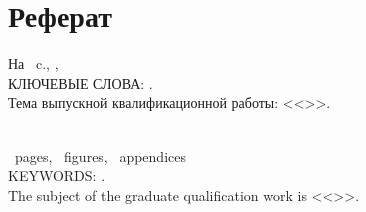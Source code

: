 \chapter*[Count-me]{Реферат} %
\thispagestyle{empty}%
%
%



На ~c.,
,
\\


{\MakeUppercase{Ключевые слова: \keywordsRu}.}\\ %

Тема выпускной квалификационной работы: <<\thesisTitle>>.


\abstractRu %
\newpage



\printTheAbstract\\ %


~pages, 
~figures, 
~appendices\\%

{\MakeUppercase{Keywords: \keywordsEn}.}\\ %

The subject of the graduate qualification work is <<\thesisTitleEn>>.

	
\abstractEn %

	


\thispagestyle{empty}
%
\newpage
